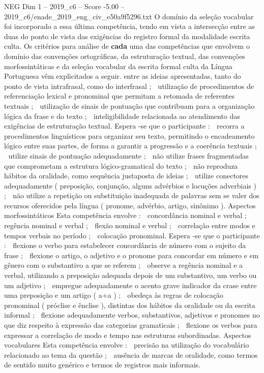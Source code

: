 \begin{textsample}{NEG Dim 1 – 2019\_c6 – Score -5.00 – 2019\_c6/enade\_2019\_eng\_civ\_e50a9f5296.txt}
O domínio da seleção vocabular foi incorporado a essa última competência, tendo em vista a intersecção entre as duas do ponto de vista das exigências do registro formal da modalidade escrita culta.
Os critérios para análise de \textbf{cada} uma das competências que envolvem o domínio das convenções ortográficas, da estruturação textual, das convenções morfossintáticas e da seleção vocabular da escrita formal culta da Língua Portuguesa vêm explicitados a seguir. entre as ideias apresentadas, tanto do ponto de vista intrafrasal, como do interfrasal ;  utilização de procedimentos de referenciação lexical e pronominal que permitam a retomada de referentes textuais ;  utilização de sinais de pontuação que contribuam para a organização lógica da frase e do texto ;  inteligibilidade relacionada ao atendimento das exigências de estruturação textual.
Espera -se que o participante :  recorra a procedimentos linguísticos para organizar seu texto, permitindo o encadeamento lógico entre suas partes, de forma a garantir a progressão e a coerência textuais ;  utilize sinais de pontuação adequadamente ;  não utilize frases fragmentadas que comprometam a estrutura lógico-gramatical do texto ;  não reproduza hábitos da oralidade, como sequência justaposta de ideias ;  utilize conectores adequadamente ( preposição, conjunção, alguns advérbios e locuções adverbiais ) ;  não utilize a repetição ou substituição inadequada de palavras sem se valer dos recursos oferecidos pela língua ( pronome, advérbio, artigo, sinônimo ).
Aspectos morfossintáticos Esta competência envolve :  concordância nominal e verbal ;  regência nominal e verbal ;  flexão nominal e verbal ;  correlação entre modos e tempos verbais no período ;  colocação pronominal.
Espera -se que o participante :  flexione o verbo para estabelecer concordância de número com o sujeito da frase ;  flexione o artigo, o adjetivo e o pronome para concordar em número e em gênero com o substantivo a que se referem ;  observe a regência nominal e a verbal, utilizando a preposição adequada depois de um substantivo, um verbo ou um adjetivo ;  empregue adequadamente o acento grave indicador da crase entre uma preposição e um artigo ( a+a ) ;  obedeça às regras de colocação pronominal ( próclise e ênclise ), distintas dos hábitos da oralidade ou da escrita informal ;  flexione adequadamente verbos, substantivos, adjetivos e pronomes no que diz respeito à expressão das categorias gramaticais ;  flexione os verbos para expressar a correlação de modo e tempo nas estruturas subordinadas.
Aspectos vocabulares Esta competência envolve :  precisão na utilização do vocabulário relacionado ao tema da questão ;  ausência de marcas de oralidade, como termos de sentido muito genérico e termos de registros mais informais.

\end{textsample}
